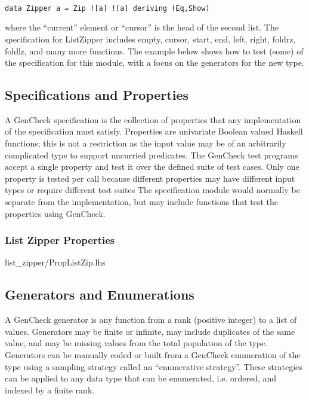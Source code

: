 \begin{verbatim}

data Zipper a = Zip ![a] ![a] deriving (Eq,Show)

\end{verbatim}

where the ``current'' element or ``cursor'' is the head of the second list.
The specification for ListZipper includes empty, cursor, start, end, left, right, foldrz, foldlz, 
and many more functions.  The example below shows how to test (some)
of the specification for this module, with a focus on the generators for the new type.

\subsection{Specifications and Properties}
A GenCheck specification is the collection of properties
that any implementation of the specification must satisfy.
Properties are univariate Boolean valued Haskell functions;
this is not a restriction as the input value may be of an arbitrarily complicated type 
to support uncurried predicates. The GenCheck test programs accept 
a single property and test it over the defined suite of test cases.
Only one property is tested per call because different properties 
may have different input types or require different test suites
The specification module would normally be separate from the implementation,
but may include functions that test the properties using GenCheck.

\subsubsection{List Zipper Properties}

 {list_zipper/PropListZip.lhs}

\subsection{Generators and Enumerations}

A GenCheck generator is any function from a rank (positive integer) to a list of values.
Generators may be finite or infinite, may include duplicates of the same value,
and may be missing values from the total population of the type.  Generators
can be manually coded or built from a GenCheck enumeration of the type using
a sampling strategy called an ``enumerative strategy''.  These strategies can be
applied to any data type that can be enumerated, i.e. ordered, and indexed by a finite rank.

